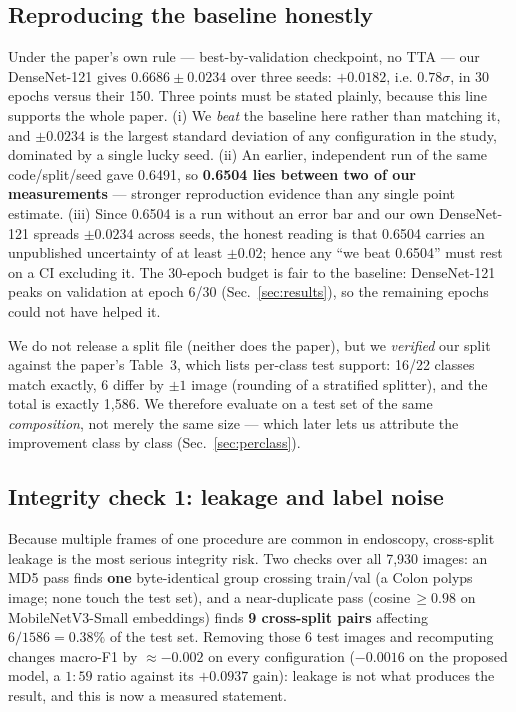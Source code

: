 \documentclass[11pt,a4paper]{article}
\newcommand{\macroF}{\textup{macro-F1}}   %
\begin{document}
\subsection{Reproducing the baseline honestly}
Under the paper's own rule --- best-by-validation checkpoint, no TTA --- our
DenseNet-121 gives $\mathbf{0.6686\pm0.0234}$ over three seeds:
$+0.0182$, i.e. $0.78\sigma$, in 30 epochs versus their 150. Three points must
be stated plainly, because this line supports the whole paper.
(i) We \emph{beat} the baseline here rather than matching it, and $\pm0.0234$ is
the largest standard deviation of any configuration in the study, dominated by a
single lucky seed. (ii) An earlier, independent run of the same
code\slash split\slash seed gave 0.6491, so \textbf{0.6504 lies between two of
our measurements} --- stronger
reproduction evidence than any single point estimate.
(iii) Since 0.6504 is a run without an error bar and our own DenseNet-121 spreads
$\pm0.0234$ across seeds, the honest reading is that 0.6504 carries an
unpublished uncertainty of at least $\pm0.02$; hence any ``we beat 0.6504'' must
rest on a CI excluding it.
The 30-epoch budget is fair to the baseline: DenseNet-121 peaks on validation at
epoch 6/30 (Sec.~\ref{sec:results}), so the remaining epochs could not have
helped it.

We do not release a split file (neither does the paper), but we \emph{verified}
our split against the paper's Table~3, which lists per-class test support:
16/22 classes match exactly, 6 differ by $\pm1$ image (rounding of a stratified
splitter), and the total is exactly 1{,}586. We therefore evaluate on a test set
of the same \emph{composition}, not merely the same size --- which later lets us
attribute the improvement class by class (Sec.~\ref{sec:perclass}).

\subsection{Integrity check 1: leakage and label noise}
Because multiple frames of one procedure are common in endoscopy, cross-split
leakage is the most serious integrity risk. Two checks over all 7{,}930 images:
an MD5 pass finds \textbf{one} byte-identical group crossing train/val (a Colon
polyps image; none touch the test set), and a near-duplicate pass
(cosine\,$\ge0.98$ on MobileNetV3-Small embeddings) finds \textbf{9 cross-split
pairs} affecting $6/1586=0.38\%$ of the test set. Removing those 6 test images
and recomputing changes \macroF{} by $\approx-0.002$ on every configuration
($-0.0016$ on the proposed model, a $1{:}59$ ratio against its $+0.0937$ gain):
leakage is not what produces the result, and this is now a measured statement.
\end{document}
